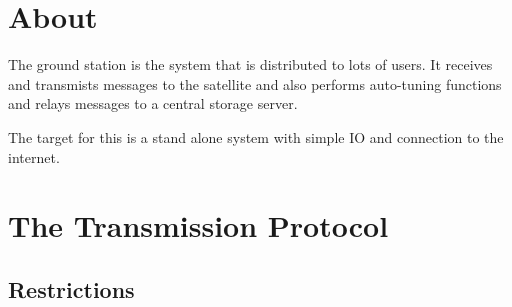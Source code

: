 \hypertarget{index_sec_1}{}\section{About}\label{index_sec_1}


 The ground station is the system that is distributed to lots of users. It receives and transmists messages to the satellite and also performs auto-\/tuning functions and relays messages to a central storage server.

The target for this is a stand alone system with simple IO and connection to the internet.\hypertarget{index_sec_2}{}\section{The Transmission Protocol}\label{index_sec_2}


 \hypertarget{index_Restrictions}{}\subsection{Restrictions}\label{index_Restrictions}

